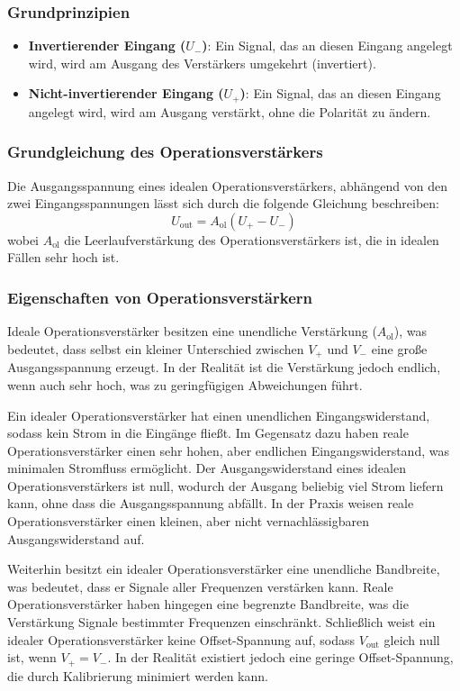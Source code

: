 \documentclass[12pt]{article}
\begin{document}
\subsubsection{Grundprinzipien}
\begin{itemize}
    \item \textbf{Invertierender Eingang (\( U_- \))}: Ein Signal, das an diesen Eingang angelegt wird, wird am Ausgang des Verstärkers umgekehrt (invertiert).
    \item \textbf{Nicht-invertierender Eingang (\( U_+ \))}: Ein Signal, das an diesen Eingang angelegt wird, wird am Ausgang verstärkt, ohne die Polarität zu ändern.
\end{itemize}

\subsubsection{Grundgleichung des Operationsverstärkers}
Die Ausgangsspannung eines idealen Operationsverstärkers, abhängend von den zwei Eingangsspannungen lässt sich durch die folgende Gleichung beschreiben:
\[
U_{\text{out}} = A_{\text{ol}} (U_+ - U_-)
\]
wobei \( A_{\text{ol}} \) die Leerlaufverstärkung des Operationsverstärkers ist, die in idealen Fällen sehr hoch ist.

\subsubsection{Eigenschaften von Operationsverstärkern}
Ideale Operationsverstärker besitzen eine unendliche Verstärkung (\( A_{\text{ol}} \)), was bedeutet, dass selbst ein kleiner Unterschied zwischen \( V_+ \) und \( V_- \) eine große Ausgangsspannung erzeugt. In der Realität ist die Verstärkung jedoch endlich, wenn auch sehr hoch, was zu geringfügigen Abweichungen führt. 

Ein idealer Operationsverstärker hat einen unendlichen Eingangswiderstand, sodass kein Strom in die Eingänge fließt. Im Gegensatz dazu haben reale Operationsverstärker einen sehr hohen, aber endlichen Eingangswiderstand, was minimalen Stromfluss ermöglicht. Der Ausgangswiderstand eines idealen Operationsverstärkers ist null, wodurch der Ausgang beliebig viel Strom liefern kann, ohne dass die Ausgangsspannung abfällt. In der Praxis weisen reale Operationsverstärker einen kleinen, aber nicht vernachlässigbaren Ausgangswiderstand auf.

Weiterhin besitzt ein idealer Operationsverstärker eine unendliche Bandbreite, was bedeutet, dass er Signale aller Frequenzen verstärken kann. Reale Operationsverstärker haben hingegen eine begrenzte Bandbreite, was die Verstärkung Signale bestimmter Frequenzen einschränkt. Schließlich weist ein idealer Operationsverstärker keine Offset-Spannung auf, sodass \( V_{\text{out}} \) gleich null ist, wenn \( V_+ = V_- \). In der Realität existiert jedoch eine geringe Offset-Spannung, die durch Kalibrierung minimiert werden kann.
\end{document}

